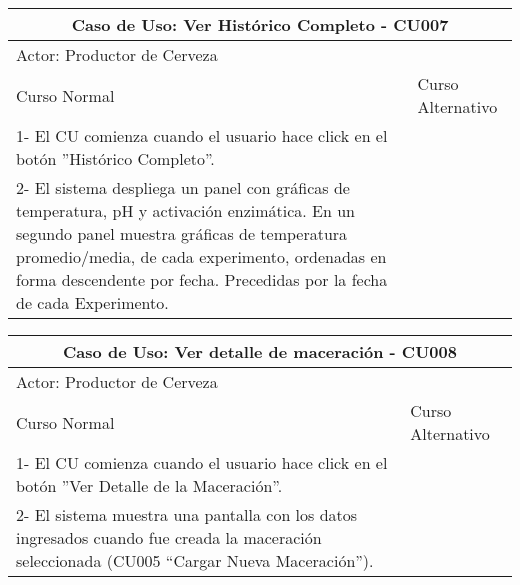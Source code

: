     
    \begin{minipage}{0.95\textwidth}
    \begin{center}
    \begin{tabularx}{\textwidth}{ | X | X |}
        \hline
        \multicolumn{2}{|c|}{\textbf{Caso de Uso: Ver Histórico Completo - CU007}} \\
        \hline
        \multicolumn{2}{|l|}{Actor: Productor de Cerveza} \\
        \hline
        Curso Normal & Curso Alternativo \\
        \hline
        1- El CU comienza cuando el usuario hace click en el botón ”Histórico Completo”. & \\
        \hline
        2- El sistema despliega un panel con gráficas de temperatura, pH y activación enzimática. En un segundo panel muestra gráficas de temperatura promedio/media, de cada experimento, ordenadas en forma descendente por fecha. Precedidas por la fecha de cada Experimento. & 
        \\
        \hline
    \end{tabularx}
    \label{CU007}
    \end{center}
    \end{minipage}
    
    
    \begin{minipage}{0.95\textwidth}
    \begin{center}
    \begin{tabularx}{\textwidth}{ | X | X |}
        \hline
        \multicolumn{2}{|c|}{\textbf{Caso de Uso: Ver detalle de maceración - CU008}} \\
        \hline
        \multicolumn{2}{|l|}{Actor: Productor de Cerveza} \\
        \hline
        Curso Normal & Curso Alternativo \\
        \hline
        1- El CU comienza cuando el usuario hace click en el botón ”Ver Detalle de la Maceración”. & \\
        \hline
        2- El sistema muestra una pantalla con los datos ingresados cuando fue creada la maceración seleccionada (CU005 “Cargar Nueva Maceración”). & 
        \\
        \hline
    \end{tabularx}
    \label{CU008}
    \end{center}
    \end{minipage}
    
